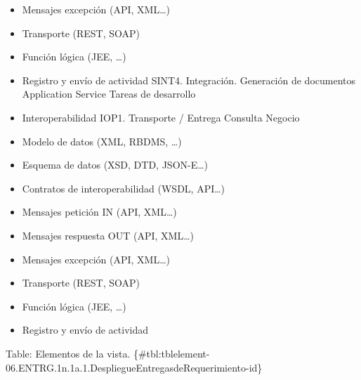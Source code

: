 \documentclass[
  paper=a4,
  ,captions=tableheading
]{scrartcl}
\begin{document}
\begin{itemize}
\item
  Mensajes excepción (API, XML\ldots)
\item
  Transporte (REST, SOAP)
\item
  Función lógica (JEE, \ldots)
\item
  Registro y envío de actividad \textbar{} \textbar{} SINT4.
  Integración. Generación de documentos \textbar{} Application Service
  \textbar{} Tareas de desarrollo
\item
  Interoperabilidad IOP1. Transporte / Entrega Consulta Negocio
\item
  Modelo de datos (XML, RBDMS, \ldots)
\item
  Esquema de datos (XSD, DTD, JSON-E\ldots)
\item
  Contratos de interoperabilidad (WSDL, API\ldots)
\item
  Mensajes petición IN (API, XML\ldots)
\item
  Mensajes respuesta OUT (API, XML\ldots)
\item
  Mensajes excepción (API, XML\ldots)
\item
  Transporte (REST, SOAP)
\item
  Función lógica (JEE, \ldots)
\item
  Registro y envío de actividad \textbar{}
\end{itemize}

Table: Elementos de la vista.
\{\#tbl:tblelement-06.ENTRG.1n.1a.1.DespliegueEntregasdeRequerimiento-id\}
\end{document}
